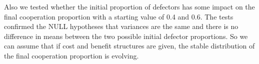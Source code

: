 \documentclass[DIV=calc, paper=a4, fontsize=11pt, twocolumn]{scrartcl}	 %
\begin{document}
\noindent Also we tested whether the initial proportion of defectors has some impact on the final cooperation proportion with a starting value of 0.4 and 0.6. The tests confirmed the NULL hypotheses that variances are the same and there is no difference in means between the two possible initial defector proportions. So we can assume that if cost and benefit structures are given, the stable distribution of the final cooperation proportion is evolving. 


\nocite{Albizu2013}



\end{document}
